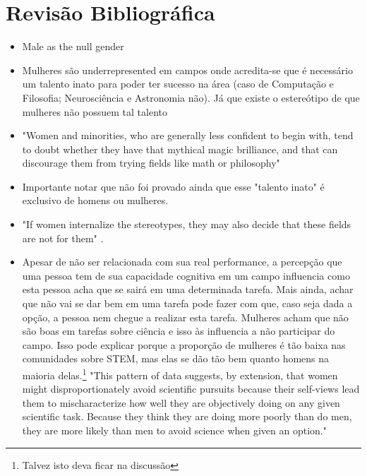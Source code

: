 \chapter{Revisão Bibliográfica}

\begin{itemize}
\item Male as the null gender\cite{fox2006women}
\end{itemize}

\begin{itemize}
	\item Mulheres são underrepresented em campos onde acredita-se que é necessário um talento inato para poder ter sucesso na área (caso de Computação e Filosofia; Neurosciência e Astronomia não)\cite{leslie2015expectations}. Já que existe o estereótipo de que mulheres não possuem tal talento\cite{tiedemann2000gender}\cite{kirkcaldy2007parental} 
	\item "Women and minorities, who are generally less confident to begin with, tend to doubt whether they have that mythical magic brilliance, and that can discourage them from trying fields like math or philosophy"\cite{leslie2015expectations}
	\item Importante notar que não foi provado ainda que esse "talento inato" é exclusivo de homens ou mulheres.\cite{hyde2005gender}
	\item "If women internalize the stereotypes, they may also decide that these fields are not for them" \cite{wigfield2000expectancy}.
	\item Apesar de não ser relacionada com sua real performance, a percepção que uma pessoa tem de sua capacidade cognitiva em um campo influencia como esta pessoa acha que se sairá em uma determinada tarefa. Mais ainda, achar que não vai se dar bem em uma tarefa pode fazer com que, caso seja dada a opção, a pessoa nem chegue a realizar esta tarefa. Mulheres acham que não são boas em tarefas sobre ciência e isso às influencia a não participar do campo.\cite{ehrlinger2003chronic} Isso pode explicar porque a proporção de mulheres é tão baixa nas comunidades sobre STEM, mas elas se dão tão bem quanto homens na maioria delas.\footnote{Talvez isto deva ficar na discussão} "This pattern of data suggests, by extension, that women might disproportionately avoid scientific pursuits because their self-views lead them to mischaracterize how well they are objectively doing on any given scientific task. Because they think they are doing more poorly than do men, they are more likely than men to avoid science when given an option."

\end{itemize}

